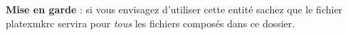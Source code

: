 \documentclass[11pt,french]{article}
\newcommand{\TS}{\textsf{\TeX Shop}}
\newcommand{\latexmk}{\textsf{latexmk}}
\newcommand{\cmdkey}{\textsf{Cmd}}
\newcommand{\mnu}[1]{\textsf{#1}}
\newcommand{\cmd}[1]{\textsf{#1}}
\begin{document}
\textbf{Mise en garde} : si vous envisagez d'utiliser cette entité sachez que le fichier \cmd{platexmkrc} servira pour \emph{tous} les fichiers composés dans ce dossier.


%
%
%
\end{document}
